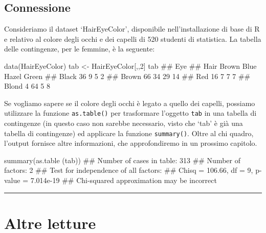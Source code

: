 \documentclass[a4paper,12pt,oneside]{book}
\newenvironment{Shaded}{\begin{snugshade}}{\end{snugshade}}
\newcommand{\DecValTok}[1]{#1}
\newcommand{\DocumentationTok}[1]{#1}
\newcommand{\OtherTok}[1]{#1}
\newcommand{\FunctionTok}[1]{#1}
\newcommand{\NormalTok}[1]{#1}
\begin{document}
\hypertarget{connessione-1}{%
\subsection{Connessione}\label{connessione-1}}

Consideriamo il dataset `HairEyeColor', disponibile nell'installazione di base di R e relativo al colore degli occhi e dei capelli di 520 studenti di statistica. La tabella delle contingenze, per le femmine, è la seguente:

\begin{Shaded}
\begin{Highlighting}[]
\FunctionTok{data}\NormalTok{(HairEyeColor)}
\NormalTok{tab }\OtherTok{\textless{}{-}}\NormalTok{ HairEyeColor[,,}\DecValTok{2}\NormalTok{]}
\NormalTok{tab}
\DocumentationTok{\#\#        Eye}
\DocumentationTok{\#\# Hair    Brown Blue Hazel Green}
\DocumentationTok{\#\#   Black    36    9     5     2}
\DocumentationTok{\#\#   Brown    66   34    29    14}
\DocumentationTok{\#\#   Red      16    7     7     7}
\DocumentationTok{\#\#   Blond     4   64     5     8}
\end{Highlighting}
\end{Shaded}

Se vogliamo sapere se il colore degli occhi è legato a quello dei capelli, possiamo utilizzare la funzione \texttt{as.table()} per trasformare l'oggetto \texttt{tab} in una tabella di contingenze (in questo caso non sarebbe necessario, visto che `tab' è già una tabella di contingenze) ed applicare la funzione \texttt{summary()}. Oltre al chi quadro, l'output fornisce altre informazioni, che approfondiremo in un prossimo capitolo.

\begin{Shaded}
\begin{Highlighting}[]
\FunctionTok{summary}\NormalTok{(}\FunctionTok{as.table}\NormalTok{ (tab))}
\DocumentationTok{\#\# Number of cases in table: 313 }
\DocumentationTok{\#\# Number of factors: 2 }
\DocumentationTok{\#\# Test for independence of all factors:}
\DocumentationTok{\#\#  Chisq = 106.66, df = 9, p{-}value = 7.014e{-}19}
\DocumentationTok{\#\#  Chi{-}squared approximation may be incorrect}
\end{Highlighting}
\end{Shaded}

\begin{center}\rule{0.5\linewidth}{0.5pt}\end{center}

\hypertarget{altre-letture-2}{%
\section{Altre letture}\label{altre-letture-2}}
\end{document}
